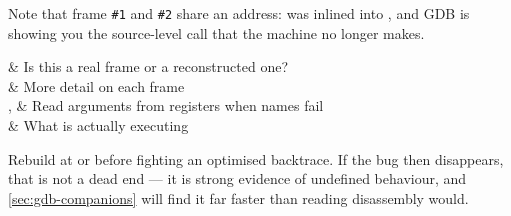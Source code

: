 
Note that frame \texttt{\#1} and \texttt{\#2} share an address:  was
inlined into , and GDB is showing you the source-level call that
the machine no longer makes.

\begin{keys}[0.32]
	             & Is this a real frame or a reconstructed one?     \\
	 & More detail on each frame      \\
	,  & Read arguments from registers when names fail    \\
	         & What is actually executing                       \\
\end{keys}

\begin{moral}
	Rebuild at  or  before fighting an optimised backtrace. If
	the bug then disappears, that is not a dead end --- it is strong evidence of
	undefined behaviour, and \autoref{sec:gdb-companions} will find it far faster
	than reading disassembly would.
\end{moral}
